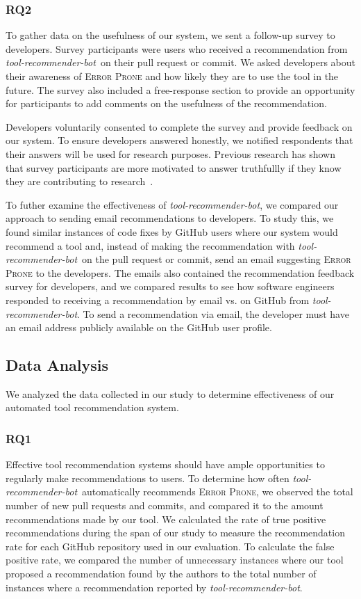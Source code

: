 \documentclass[sigconf,review,anonymous]{acmart}
\newcommand{\tool}{\textsl{tool-recommender-bot}}
\begin{document}
\subsubsection{RQ2}

To gather data on the usefulness of our system, we sent a follow-up survey to developers. Survey participants were users who received a recommendation from \tool~on their pull request or commit. We asked developers about their awareness of \textsc{Error Prone} and how likely they are to use the tool in the future. The survey also included a free-response section to provide an opportunity for participants to add comments on the usefulness of the recommendation.

Developers voluntarily consented to complete the survey and provide feedback on our system. To ensure developers answered honestly, we notified respondents that their answers will be used for research purposes. Previous research has shown that survey participants are more motivated to answer truthfullly if they know they are contributing to research~\cite{Krosnick1991Research}. 

To futher examine the effectiveness of \tool, we compared our approach to sending email recommendations to developers. To study this, we found similar instances of code fixes by GitHub users where our system would recommend a tool and, instead of making the recommendation with \tool~on the pull request or commit, send an email suggesting \textsc{Error Prone} to the developers. The emails also contained the recommendation feedback survey for developers, and we compared results to see how software engineers responded to receiving a recommendation by email vs. on GitHub from \tool. To send a recommendation via email, the developer must have an email address publicly available on the GitHub user profile. 

\subsection{Data Analysis}

We analyzed the data collected in our study to determine effectiveness of our automated tool recommendation system.

\subsubsection{RQ1}

Effective tool recommendation systems should have ample opportunities to regularly make recommendations to users. To determine how often \tool~automatically recommends \textsc{Error Prone}, we observed the total number of new pull requests and commits, and compared it to the amount recommendations made by our tool. We calculated the rate of true positive recommendations during the span of our study to measure the recommendation rate for each GitHub repository used in our evaluation. To calculate the false positive rate, we compared the number of unnecessary instances where our tool proposed a recommendation found by the authors to the total number of instances where a recommendation reported by \tool.
\end{document}
